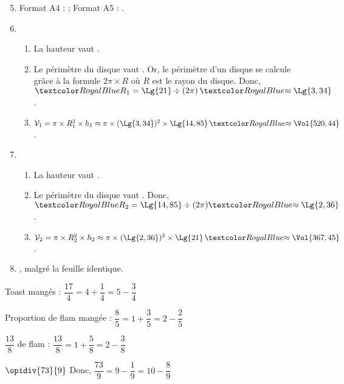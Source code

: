    \begin{enumerate}
      \setcounter{enumi}{4}
         \item Format A4 :  ; Format A5 : .
         \item
            \begin{enumerate}
               \item La hauteur vaut .
               \item Le périmètre du disque vaut . Or, le périmètre d'un disque se calcule grâce à la formule $2\pi\times R$ où $R$ est le rayon du disque. Donc,  $\cor{R_1} =\Lg{21}\div(2\pi) \, \cor{\approx\Lg{3,34}}$.
               \item $\mathcal{V}_1 =\pi\times R_1^2\times h_1 \approx\pi\times(\Lg{3,34})^2\times\Lg{14,85} \, \cor{\approx\Vol{520,44}}$.
            \end{enumerate}
         \item
            \begin{enumerate}
               \item La hauteur vaut .
               \item Le périmètre du disque vaut . Donc,  $\cor{R_2} =\Lg{14,85}\div(2\pi) \cor{\approx\Lg{2,36}}$.
               \item $\mathcal{V}_2 =\pi\times R_2^2\times h_2 \approx\pi\times(\Lg{2,36})^2\times\Lg{21} \, \cor{\approx\Vol{367,45}}$.
            \end{enumerate}
         \item {}, malgré la feuille identique.
      \end{enumerate}

\pagebreak



    Toast mangés : \quad {} \quad $\dfrac{17}{4} = 4+\dfrac14 =5-\dfrac34$ \par \medskip
    Proportion de flam mangée : $\dfrac85 =1+\dfrac35 =2-\dfrac25$ \par \medskip
    $\dfrac{13}{8}$ de flam : \quad {} \quad $\dfrac{13}{8} =1+\dfrac58 =2-\dfrac38$ \par \medskip
    $\opidiv{73}{9}$ \qquad Donc, $\dfrac{73}{9} =9-\dfrac19 =10-\dfrac89$

